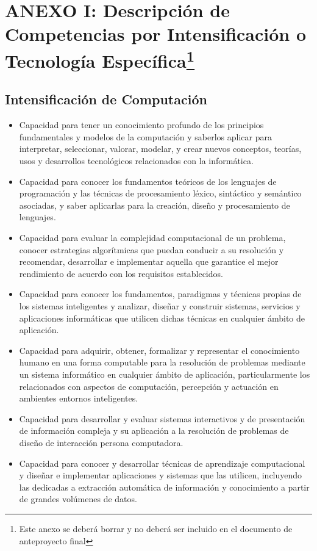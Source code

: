 \documentclass{pre-tfg}
\begin{document}
\newpage
\section*{ANEXO I: Descripción de Competencias por Intensificación o Tecnología
Específica\footnote{Este anexo se deberá borrar y no deberá ser incluido en el documento de anteproyecto final}}

\subsection*{Intensificación de Computación}

\begin{itemize}
\item Capacidad para tener un conocimiento profundo de los principios fundamentales y
  modelos de la computación y saberlos aplicar para interpretar, seleccionar, valorar,
  modelar, y crear nuevos conceptos, teorías, usos y desarrollos tecnológicos relacionados
  con la informática.
\item Capacidad para conocer los fundamentos teóricos de los lenguajes de programación y
  las técnicas de procesamiento léxico, sintáctico y semántico asociadas, y saber
  aplicarlas para la creación, diseño y procesamiento de lenguajes.
\item Capacidad para evaluar la complejidad computacional de un problema, conocer
  estrategias algorítmicas que puedan conducir a su resolución y recomendar, desarrollar e
  implementar aquella que garantice el mejor rendimiento de acuerdo con los requisitos
  establecidos.
\item Capacidad para conocer los fundamentos, paradigmas y técnicas propias de los
  sistemas inteligentes y analizar, diseñar y construir sistemas, servicios y aplicaciones
  informáticas que utilicen dichas técnicas en cualquier ámbito de aplicación.
\item Capacidad para adquirir, obtener, formalizar y representar el conocimiento humano en
  una forma computable para la resolución de problemas mediante un sistema informático en
  cualquier ámbito de aplicación, particularmente los relacionados con aspectos de
  computación, percepción y actuación en ambientes entornos inteligentes.
\item Capacidad para desarrollar y evaluar sistemas interactivos y de presentación de
  información compleja y su aplicación a la resolución de problemas de diseño de
  interacción persona computadora.
\item Capacidad para conocer y desarrollar técnicas de aprendizaje computacional y diseñar
  e implementar aplicaciones y sistemas que las utilicen, incluyendo las dedicadas a
  extracción automática de información y conocimiento a partir de grandes volúmenes de
  datos.
\end{itemize}
\end{document}
